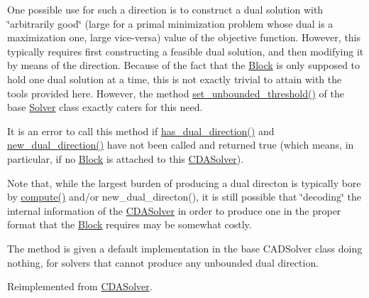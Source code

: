 One possible use for such a direction is to construct a dual solution with \char`\"{}arbitrarily good\char`\"{} (large for a primal minimization problem whose dual is a maximization one, large vice-\/versa) value of the objective function. However, this typically requires first constructing a feasible dual solution, and then modifying it by means of the direction. Because of the fact that the \mbox{\hyperlink{class_s_m_spp__di__unipi__it_1_1_block}{Block}} is only supposed to hold one dual solution at a time, this is not exactly trivial to attain with the tools provided here. However, the method \mbox{\hyperlink{class_s_m_spp__di__unipi__it_1_1_solver_ae1717d1363782e086aa797e7437c0352}{set\+\_\+unbounded\+\_\+threshold()}} of the base \mbox{\hyperlink{class_s_m_spp__di__unipi__it_1_1_solver}{Solver}} class exactly caters for this need.

It is an error to call this method if \mbox{\hyperlink{class_s_m_spp__di__unipi__it_1_1_m_c_f_solver_a3a262f8106b76603f0828e41bbe5b022}{has\+\_\+dual\+\_\+direction()}} and \mbox{\hyperlink{class_s_m_spp__di__unipi__it_1_1_c_d_a_solver_ad83925e362d49bbe570a881791e45ea0}{new\+\_\+dual\+\_\+direction()}} have not been called and returned true (which means, in particular, if no \mbox{\hyperlink{class_s_m_spp__di__unipi__it_1_1_block}{Block}} is attached to this \mbox{\hyperlink{class_s_m_spp__di__unipi__it_1_1_c_d_a_solver}{C\+D\+A\+Solver}}).

Note that, while the largest burden of producing a dual directon is typically bore by \mbox{\hyperlink{class_s_m_spp__di__unipi__it_1_1_m_c_f_solver_afc8ff54ab05d22f4cca0fb0bfbeb7a49}{compute()}} and/or new\+\_\+dual\+\_\+directon(), it is still possible that \char`\"{}decoding\char`\"{} the internal information of the \mbox{\hyperlink{class_s_m_spp__di__unipi__it_1_1_c_d_a_solver}{C\+D\+A\+Solver}} in order to produce one in the proper format that the \mbox{\hyperlink{class_s_m_spp__di__unipi__it_1_1_block}{Block}} requires may be somewhat costly.

The method is given a default implementation in the base C\+A\+D\+Solver class doing nothing, for solvers that cannot produce any unbounded dual direction. 

Reimplemented from \mbox{\hyperlink{class_s_m_spp__di__unipi__it_1_1_c_d_a_solver_a145672680f07ca7eef090900b8d6ddcf}{C\+D\+A\+Solver}}.

\mbox{\label{class_s_m_spp__di__unipi__it_1_1_m_c_f_solver_a7ceb04914b5dcbb1cfd8f0e844b56014}} 
